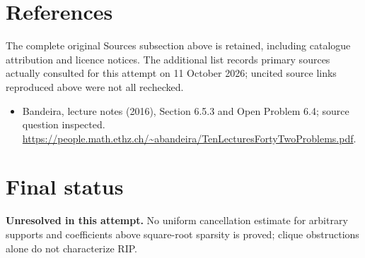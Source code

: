 \documentclass[11pt]{article}
\begin{document}
\section{References}
The complete original Sources subsection above is retained, including catalogue attribution and licence notices. The additional list records primary sources actually consulted for this attempt on 11 October 2026; uncited source links reproduced above were not all rechecked.
\begin{itemize}
\item Bandeira, lecture notes (2016), Section 6.5.3 and Open Problem 6.4; source question inspected. \url{https://people.math.ethz.ch/~abandeira/TenLecturesFortyTwoProblems.pdf}.
\end{itemize}
\section{Final status}
\textbf{Unresolved in this attempt.} No uniform cancellation estimate for arbitrary supports and coefficients above square-root sparsity is proved; clique obstructions alone do not characterize RIP.
\end{document}
